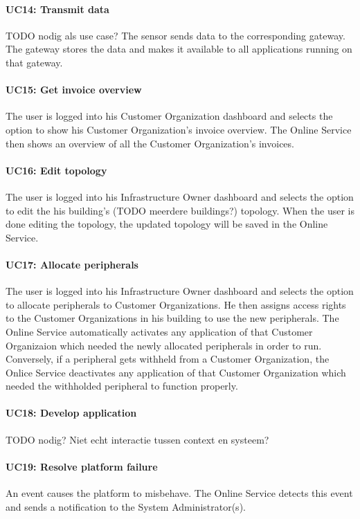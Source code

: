 \documentclass[english,peerreview]{sareport}
\begin{document}
\paragraph{UC14: Transmit data}
TODO nodig als use case?
The sensor sends data to the corresponding gateway. The gateway stores the data and makes it available to all applications running on that gateway.

\paragraph{UC15: Get invoice overview}
The user is logged into his Customer Organization dashboard and selects the option to show his Customer Organization's invoice overview. The Online Service then shows an overview of all the Customer Organization's invoices.

\paragraph{UC16: Edit topology}
The user is logged into his Infrastructure Owner dashboard and selects the option to edit the his building's (TODO meerdere buildings?) topology. When the user is done editing the topology, the updated topology will be saved in the Online Service.

\paragraph{UC17: Allocate peripherals}
The user is logged into his Infrastructure Owner dashboard and selects the option to allocate peripherals to Customer Organizations. He then assigns access rights to the Customer Organizations in his building to use the new peripherals. The Online Service automatically activates any application of that Customer Organizaion which needed the newly allocated peripherals in order to run. Conversely, if a peripheral gets withheld from a Customer Organization, the Onlice Service deactivates any application of that Customer Organization which needed the withholded peripheral to function properly.

\paragraph{UC18: Develop application}
TODO nodig? Niet echt interactie tussen context en systeem?

\paragraph{UC19: Resolve platform failure}
An event causes the platform to misbehave. The Online Service detects this event and sends a notification to the System Administrator(s).
\end{document}
